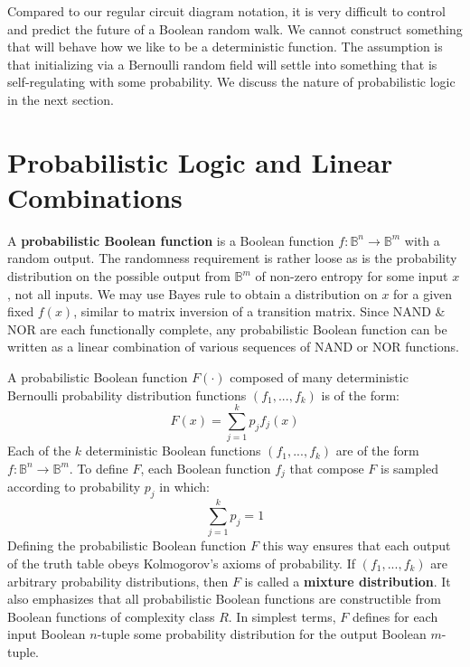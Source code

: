 \documentclass[10pt, a5paper, twoside, openright]{memoir}
\begin{document}
Compared to our regular circuit diagram notation, it is very difficult to control and predict the future of a Boolean random walk. We cannot construct something that will behave how we like to be a deterministic function. The assumption is that initializing via a Bernoulli random field will settle into something that is self-regulating with some probability. We discuss the nature of probabilistic logic in the next section.


\section{Probabilistic Logic and Linear Combinations}
A \textbf{probabilistic Boolean function} is a Boolean function $f: \mathbb B^n \rightarrow \mathbb B^m$ with a random output. The randomness requirement is rather loose as is the probability distribution on the possible output from $\mathbb B^m$ of non-zero entropy for some input $x$, not all inputs. We may use Bayes rule to obtain a distribution on $x$ for a given fixed $f(x)$, similar to matrix inversion of a transition matrix. Since NAND \& NOR are each functionally complete, any probabilistic Boolean function can be written as a linear combination of various sequences of NAND or NOR functions.

A probabilistic Boolean function $F(\cdot)$ composed of many deterministic Bernoulli probability distribution functions $(f_1,...,f_k)$ is of the form:
$$ F(x) = \sum\limits_{j=1}^k p_j f_j(x)$$
Each of the $k$ deterministic Boolean functions $(f_1,...,f_k)$ are of the form $f: \mathbb B^n \rightarrow \mathbb B^m$. To define $F$, each Boolean function $f_j$ that compose $F$ is sampled according to probability $p_j$ in which:
$$ \sum\limits_{j=1}^k p_j = 1$$
Defining the probabilistic Boolean function $F$ this way ensures that each output of the truth table obeys Kolmogorov's axioms of probability. If $(f_1,...,f_k)$ are arbitrary probability distributions, then $F$ is called a \textbf{mixture distribution}. It also emphasizes that all probabilistic Boolean functions are constructible from Boolean functions of complexity class $R$. In simplest terms, $F$ defines for each input Boolean $n$-tuple some probability distribution for the output Boolean $m$-tuple.
\end{document}
